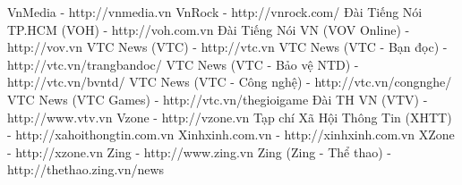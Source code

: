     VnMedia - http://vnmedia.vn
    VnRock - http://vnrock.com/
    Đài Tiếng Nói TP.HCM (VOH) - http://voh.com.vn
    Đài Tiếng Nói VN (VOV Online) - http://vov.vn
    VTC News (VTC) - http://vtc.vn
    VTC News (VTC - Bạn đọc) - http://vtc.vn/trangbandoc/
    VTC News (VTC - Bảo vệ NTD) - http://vtc.vn/bvntd/
    VTC News (VTC - Công nghệ) - http://vtc.vn/congnghe/
    VTC News (VTC Games) - http://vtc.vn/thegioigame
    Đài TH VN (VTV) - http://www.vtv.vn
    Vzone - http://vzone.vn
    Tạp chí Xã Hội Thông Tin (XHTT) - http://xahoithongtin.com.vn
    Xinhxinh.com.vn - http://xinhxinh.com.vn
    XZone - http://xzone.vn
    Zing - http://www.zing.vn
    Zing (Zing - Thể thao) - http://thethao.zing.vn/news





